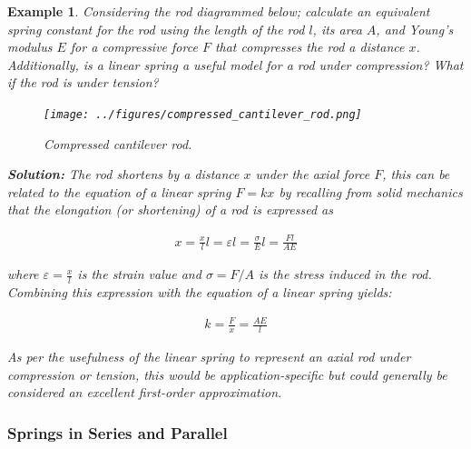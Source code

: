 \documentclass[12pt,letter]{article}
\newtheorem{ex}{Example}
\numberwithin{ex}{section} %
\newenvironment{example}{\begin{mdframed}[middlelinewidth=0.5mm]\begin{ex}\normalfont}{\end{ex}\end{mdframed}}
\numberwithin{re}{section} %
\numberwithin{vcs}{section} %
\begin{document}
			\begin{example}
    			
    			Considering the rod diagrammed below; calculate an equivalent spring constant for the rod using the length of the rod $l$, its area $A$, and Young's modulus $E$ for a compressive force $F$ that compresses the rod a distance $x$. Additionally, is a linear spring a useful model for a rod under compression? What if the rod is under tension?
        
		 		\begin{figure}[H]
		 			\centering
		 			\texttt{[image: ../figures/compressed\_cantilever\_rod.png]}
		 			\caption{Compressed cantilever rod. }
		 		\end{figure}	   
       
			    \textbf{Solution:} The rod shortens by a distance $x$ under the axial force $F$, this can be related to the equation of a linear spring $F=kx$ by recalling from solid mechanics that the elongation (or shortening) of a rod is expressed as 
			
			    \begin{eqnarray}
			    x=\frac{x}{l}l=\varepsilon l = \frac{\sigma}{E}l = \frac{Fl}{AE}
			    \end{eqnarray}    
			    
			    where  $\varepsilon = \frac{x}{l}$ is the strain value and $\sigma = F/A$ is the stress induced in the rod. Combining this expression with the equation of a linear spring yields:
			    
			    \begin{eqnarray}
			    k = \frac{F}{x}= \frac{AE}{l}
			    \end{eqnarray}     
			   
			    As per the usefulness of the linear spring to represent an axial rod under compression or tension, this would be application-specific but could generally be considered an excellent first-order approximation.  
			
			\end{example}

		\subsubsection{Springs in Series and Parallel}
			
\end{document}
